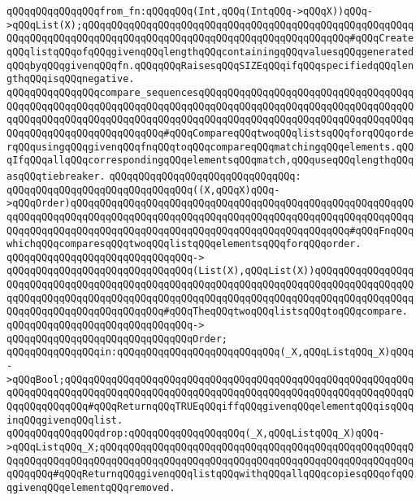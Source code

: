 \newline
\verb|qQQqqQQqqQQqqQQqfrom_fn:qQQqqQQq(Int,qQQq(IntqQQq->qQQqX))qQQq->qQQqList(X);qQQqqQQqqQQqqQQqqQQqqQQqqQQqqQQqqQQqqQQqqQQqqQQqqQQqqQQqqQQqqQQqqQQqqQQqqQQqqQQqqQQqqQQqqQQqqQQqqQQqqQQqqQQqqQQqqQQq#qQQqCreateqQQqlistqQQqofqQQqgivenqQQqlengthqQQqcontainingqQQqvaluesqQQqgeneratedqQQqbyqQQqgivenqQQqfn.qQQqqQQqRaisesqQQqSIZEqQQqifqQQqspecifiedqQQqlengthqQQqisqQQqnegative.|\newline
\newline
\verb|qQQqqQQqqQQqqQQqcompare_sequencesqQQqqQQqqQQqqQQqqQQqqQQqqQQqqQQqqQQqqQQqqQQqqQQqqQQqqQQqqQQqqQQqqQQqqQQqqQQqqQQqqQQqqQQqqQQqqQQqqQQqqQQqqQQqqQQqqQQqqQQqqQQqqQQqqQQqqQQqqQQqqQQqqQQqqQQqqQQqqQQqqQQqqQQqqQQqqQQqqQQqqQQqqQQqqQQqqQQqqQQqqQQq#qQQqCompareqQQqtwoqQQqlistsqQQqforqQQqorderqQQqusingqQQqgivenqQQqfnqQQqtoqQQqcompareqQQqmatchingqQQqelements.qQQqIfqQQqallqQQqcorrespondingqQQqelementsqQQqmatch,qQQquseqQQqlengthqQQqasqQQqtiebreaker.|\newline
\verb|qQQqqQQqqQQqqQQqqQQqqQQqqQQqqQQq:|\newline
\verb|qQQqqQQqqQQqqQQqqQQqqQQqqQQqqQQq((X,qQQqX)qQQq->qQQqOrder)qQQqqQQqqQQqqQQqqQQqqQQqqQQqqQQqqQQqqQQqqQQqqQQqqQQqqQQqqQQqqQQqqQQqqQQqqQQqqQQqqQQqqQQqqQQqqQQqqQQqqQQqqQQqqQQqqQQqqQQqqQQqqQQqqQQqqQQqqQQqqQQqqQQqqQQqqQQqqQQqqQQqqQQqqQQqqQQqqQQqqQQqqQQq#qQQqFnqQQqwhichqQQqcomparesqQQqtwoqQQqlistqQQqelementsqQQqforqQQqorder.|\newline
\verb|qQQqqQQqqQQqqQQqqQQqqQQqqQQqqQQq->|\newline
\verb|qQQqqQQqqQQqqQQqqQQqqQQqqQQqqQQq(List(X),qQQqList(X))qQQqqQQqqQQqqQQqqQQqqQQqqQQqqQQqqQQqqQQqqQQqqQQqqQQqqQQqqQQqqQQqqQQqqQQqqQQqqQQqqQQqqQQqqQQqqQQqqQQqqQQqqQQqqQQqqQQqqQQqqQQqqQQqqQQqqQQqqQQqqQQqqQQqqQQqqQQqqQQqqQQqqQQqqQQqqQQqqQQqqQQq#qQQqTheqQQqtwoqQQqlistsqQQqtoqQQqcompare.|\newline
\verb|qQQqqQQqqQQqqQQqqQQqqQQqqQQqqQQq->|\newline
\verb|qQQqqQQqqQQqqQQqqQQqqQQqqQQqqQQqOrder;|\newline
\newline
\verb|qQQqqQQqqQQqqQQqin:qQQqqQQqqQQqqQQqqQQqqQQqqQQq(_X,qQQqListqQQq_X)qQQq->qQQqBool;qQQqqQQqqQQqqQQqqQQqqQQqqQQqqQQqqQQqqQQqqQQqqQQqqQQqqQQqqQQqqQQqqQQqqQQqqQQqqQQqqQQqqQQqqQQqqQQqqQQqqQQqqQQqqQQqqQQqqQQqqQQqqQQqqQQqqQQqqQQqqQQq#qQQqReturnqQQqTRUEqQQqiffqQQqgivenqQQqelementqQQqisqQQqinqQQqgivenqQQqlist.|\newline
\verb|qQQqqQQqqQQqqQQqdrop:qQQqqQQqqQQqqQQqqQQq(_X,qQQqListqQQq_X)qQQq->qQQqListqQQq_X;qQQqqQQqqQQqqQQqqQQqqQQqqQQqqQQqqQQqqQQqqQQqqQQqqQQqqQQqqQQqqQQqqQQqqQQqqQQqqQQqqQQqqQQqqQQqqQQqqQQqqQQqqQQqqQQqqQQqqQQqqQQqqQQqqQQq#qQQqReturnqQQqgivenqQQqlistqQQqwithqQQqallqQQqcopiesqQQqofqQQqgivenqQQqelementqQQqremoved.|\newline
